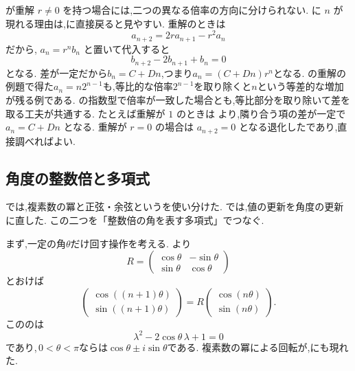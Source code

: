 が重解 $r\ne0$ を持つ場合には,二つの異なる倍率の方向に分けられない.
に $n$ が現れる理由は,に直接戻ると見やすい.
重解のときは
\[
  a_{n+2}=2r a_{n+1}-r^2a_n
\]
だから,\,$\,a_n=r^n b_n$ と置いて代入すると
\[
  b_{n+2}-2b_{n+1}+b_n=0
\]
となる.
差が一定だから$b_n=C+Dn$,つまり$a_n=(C+Dn)r^n$となる.
の重解の例題で得た$a_n=n2^{n-1}$も,等比的な倍率$2^{n-1}$を取り除くと$n$という等差的な増加が残る例である.
の指数型で倍率が一致した場合とも,等比部分を取り除いて差を取る工夫が共通する.
たとえば重解が $1$ のときは
\BookMathLayout{\[
  a_{n+2}-2a_{n+1}+a_n
  =(a_{n+2}-a_{n+1})-(a_{n+1}-a_n)=0
\]}{
\[
\begin{aligned}
a_{n+2}-2a_{n+1}+a_n\\
{}=(a_{n+2}-a_{n+1})-(a_{n+1}-a_n)\\
{}=0
\end{aligned}
\]
}
より,隣り合う項の差が一定で $a_n=C+Dn$ となる.
重解が $r=0$ の場合は $a_{n+2}=0$ となる退化したであり,直接調べればよい.

\subsection{角度の整数倍と多項式}\label{節：三角関数型漸化式からチェビシェフ多項式へ}

では,複素数の冪と正弦・余弦というを使い分けた.
では,値の更新を角度の更新に直した.
この二つを「整数倍の角を表す多項式」でつなぐ.

まず,一定の角$\theta$だけ回す操作を考える.
より
\[
  R=\begin{pmatrix}\cos\theta&-\sin\theta\\
                  \sin\theta&\cos\theta\end{pmatrix}
\]
とおけば
\[
  \begin{pmatrix}\cos((n+1)\theta)\\\sin((n+1)\theta)\end{pmatrix}
  =R\begin{pmatrix}\cos(n\theta)\\\sin(n\theta)\end{pmatrix}.
\]
こののは
\[
  \lambda^2-2\cos\theta\,\lambda+1=0
\]
であり,\,$0<\theta<\pi$ならは$\cos\theta\pm i\sin\theta$である.
複素数の冪による回転が,にも現れた.

